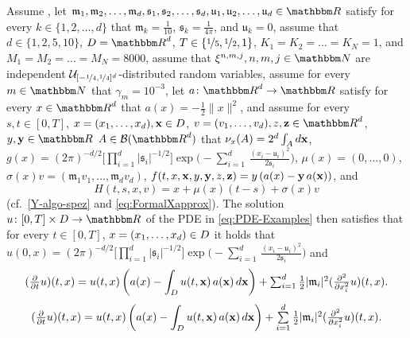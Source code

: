 Assume , 
let
$\mathfrak{m}_1,\mathfrak{m}_2,\dots,\mathfrak{m}_d,\mathfrak{s}_1,\mathfrak{s}_2,\dots,\mathfrak{s}_d,\mathfrak{u}_1, \mathfrak{u}_2, \dots,\mathfrak{u}_d \in \R$
satisfy for every
$k \in \{1,2,\dots,d\}$
that
$\mathfrak{m}_k = \tfrac{1}{10}$,
$\mathfrak{s}_k = \tfrac{1}{4\pi}$,
and
$\mathfrak{u}_k = 0$,
assume that
$d\in\{1,2,5,10\}$,
$\D = \R^d$,
$T\in\{\nicefrac{1}{5},\nicefrac{1}{2},1\}$,
$K_1 = K_2 = \ldots = K_N= 1$, and
$M_1 = M_2 = \ldots = M_N= 8000$,
assume that 
$\xi^{n,m,j}, n, m, j \in \N$
are independent $\mathcal{U}_{[-\nicefrac{1}{4},\nicefrac{1}{4}]^d}$-distributed random variables,
assume for every 
$m \in \N$
that
$\gamma_m = 10^{-3}$,
let
$a \colon \R^d \to \R$
satisfy for every
$x \in \R^d$
that
$a(x) = -\frac{1}{2}\|x\|^2$,
and
assume for every 
$s,t \in [0,T]$,
$x = (x_1,\dots,x_d), {\textbf x} \in D$,
$v= (v_1,\dots,v_d), z, {\textbf z} \in \R^d$,
$y,{\textbf y} \in \R$
$A \in \mathcal{B}(\R^d)$
that
$\nu_x(A) = 2^{d} \int_A d{\textbf x}$,
$g(x)= (2\pi)^{-d/2}\big[ \prod_{ i = 1 }^d |\mathfrak{s}_i|^{-1/2}\big] \exp \! \big(-\sum_{i = 1}^d \, \frac{(x_i - \mathfrak{u}_i )^2}{2\mathfrak{s}_i}\big)$,
$\mu(x)=(0,\dots,0)$,
$\sigma(x)v=(\mathfrak{m}_1 v_1, \dots, \mathfrak{m}_d v_d)$, 
$f(t,x,{\textbf x},y,{\textbf y}, z, {\textbf z}) = y \left(a(x) -  {\textbf y} \, a({\textbf x}) \right)$,
and
\begin{equation}
	H(t,s,x,v)=x + \mu(x)(t-s)+ \sigma(x)v
\end{equation}
(cf.\ \eqref{Y-algo-spez} and \eqref{eq:FormalXapprox}).
The solution $u\colon[0,T]\times \D \to \R$ of the PDE in \eqref{eq:PDE-Examples} then satisfies that for every
$t\in [0,T]$,
$x = (x_1, \dots, x_d) \in D$
it holds that
$u(0,x)= (2\pi)^{-d/2}\big[ \prod_{ i = 1 }^d |\mathfrak{s}_i|^{-1/2}\big] \exp \! \big(-\sum_{i = 1}^d \, \frac{(x_i - \mathfrak{u}_i )^2}{2\mathfrak{s}_i}\big)$ 
and
\begin{equation}
	 (\tfrac{\partial }{\partial t}u) (t,x) = u(t,x)\left(a(x) - \int_{D} u(t,{\textbf x})\, a({\textbf x}) \, d{\textbf x} \right) +  \textstyle\sum_{i=1}^{d} \frac{1}{2} |\mathfrak{m}_i|^2 (\tfrac{\partial^2 }{\partial x_i^2} u) (t,x).
	\label{eq:aniso_mutator_selector}
\end{equation}
%
\begin{equation}
	(\tfrac{\partial }{\partial t}u) (t,x) = u(t,x)\left(a(x) - \int_{D} u(t,{\textbf x})\, a({\textbf x}) \, d{\textbf x} \right) +  \textstyle\sum\limits_{i=1}^{d} \frac{1}{2} |\mathfrak{m}_i|^2 (\tfrac{\partial^2 }{\partial x_i^2} u) (t,x).
   \label{eq:aniso_mutator_selector}
\end{equation}
